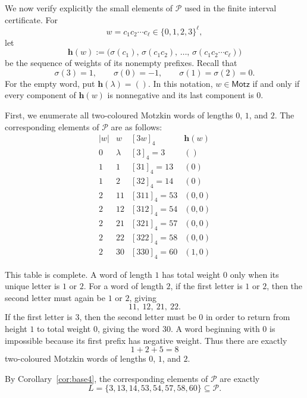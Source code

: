 \documentclass{ws-ijfcs}
\newcommand{\Pset}{\mathcal P}
\begin{document}
We now verify explicitly the small elements of $\Pset$ used in the finite
interval certificate.  For
\[
 w=c_1c_2\cdots c_\ell\in\{0,1,2,3\}^{\ell},
\]
let
\[
 \mathbf h(w):=
 \bigl(
 \sigma(c_1),\,
 \sigma(c_1c_2),\,
 \ldots,\,
 \sigma(c_1c_2\cdots c_\ell)
 \bigr)
\]
be the sequence of weights of its nonempty prefixes.  Recall that
\[
 \sigma(3)=1,\qquad
 \sigma(0)=-1,\qquad
 \sigma(1)=\sigma(2)=0.
\]
For the empty word, put $\mathbf h(\lambda)=()$.  In this notation,
$w\in\mathsf{Motz}$ if and only if every component of $\mathbf h(w)$ is
nonnegative and its last component is $0$.

First, we enumerate all two-coloured Motzkin words of lengths $0$, $1$,
and $2$.  The corresponding elements of $\Pset$ are as follows:
\[
\begin{array}{c|c|c|c}
 |w|&w&[3w]_4&\mathbf h(w)\\ \hline
0&\lambda &[3]_4=3&()\\ \hline
1&1 &[31]_4=13&(0)\\
1&2 &[32]_4=14&(0)\\ \hline
2&11 &[311]_4=53&(0,0)\\
2&12 &[312]_4=54&(0,0)\\
2&21 &[321]_4=57&(0,0)\\
2&22 &[322]_4=58&(0,0)\\
2&30 &[330]_4=60&(1,0)
\end{array}
\]

This table is complete.  A word of length $1$ has total weight $0$ only
when its unique letter is $1$ or $2$.  For a word of length $2$, if the
first letter is $1$ or $2$, then the second letter must again be $1$ or
$2$, giving
\[
 11,\ 12,\ 21,\ 22.
\]
If the first letter is $3$, then the second letter must be $0$ in order
to return from height $1$ to total weight $0$, giving the word $30$.
A word beginning with $0$ is impossible because its first prefix has
negative weight.  Thus there are exactly
\[
 1+2+5=8
\]
two-coloured Motzkin words of lengths $0$, $1$, and $2$.

By Corollary~\ref{cor:base4}, the corresponding elements of $\Pset$ are
exactly
\begin{equation}\label{eq:L-def}
 L=\{3,13,14,53,54,57,58,60\}
 \subseteq\Pset.
\end{equation}
\end{document}
